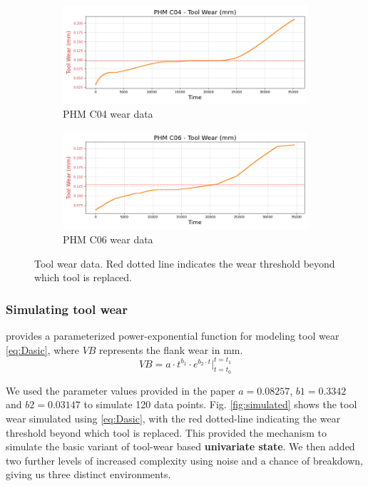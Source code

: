 \documentclass[a4paper, 12pt]{article}
\begin{document}
\begin{figure}[h]
	\begin{subfigure}[b]{0.5\textwidth}
		\centering
		\includegraphics[width=\textwidth]{PHM_C04_wear_plot.png}  
		\caption{PHM C04 wear data}
		\label{fig:C04}
	\end{subfigure}
	\hfill
	\begin{subfigure}[b]{0.5\textwidth}
		\centering
		\includegraphics[width=\textwidth]{PHM_C06_wear_plot.png}  
		\caption{PHM C06 wear data}
		\label{fig:C06}
	\end{subfigure} 
	\label{fig:tool wear-plots}
	\caption{Tool wear data. Red dotted line indicates the wear threshold beyond which tool is replaced.}
\end{figure}

\subsubsection*{Simulating tool wear}
\cite{dasic2006} provides a parameterized power-exponential function for modeling tool wear \eqref{eq:Dasic}, where $VB$ represents the flank wear in mm.
\begin{equation}
	VB = a \cdot t^{b_1} \cdot e^{b_2 \cdot t} \Big|_{t=t_0}^{t=t_1}
	\label{eq:Dasic}
\end{equation}

We used the parameter values provided in the paper $a=0.08257$, $b1=0.3342$ and $b2=0.03147$ to simulate 120 data points. Fig. \ref{fig:simulated} shows the tool wear simulated using \eqref{eq:Dasic}, with the red dotted-line indicating the wear threshold beyond which tool is replaced. This provided the mechanism to simulate the basic variant of tool-wear based \textbf{univariate state}. We then added two further levels of increased complexity using noise and a chance of breakdown, giving us three distinct environments. 
\end{document}
